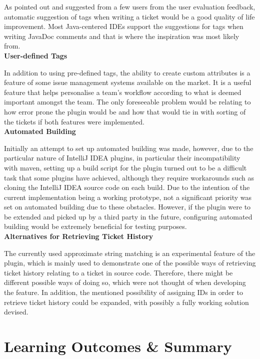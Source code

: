 \documentclass{4thYearProject}
\begin{document}
As pointed out and suggested from a few users from the user evaluation feedback, automatic suggestion of tags when writing a ticket would be a good quality of life improvement. Most Java-centered IDEs support the suggestions for tags when writing JavaDoc comments and that is where the inspiration was most likely from.\\ 
\newline
\textbf{User-defined Tags}

In addition to using pre-defined tags, the ability to create custom attributes is a feature of some issue management systems available on the market. It is a useful feature that helps personalise a team's workflow according to what is deemed important amongst the team. The only foreseeable problem would be relating to how error prone the plugin would be and how that would tie in with sorting of the tickets if both features were implemented. \\
\newline
\textbf{Automated Building}

Initially an attempt to set up automated building was made, however, due to the particular nature of IntelliJ IDEA plugins, in particular their incompatibility with  maven, setting up a build script for the plugin turned out to be a difficult task that some plugins have achieved, although they require workarounds such as cloning the IntelliJ IDEA source code on each build. Due to the intention of the current implementation being a working prototype, not a significant priority was set on automated building due to these obstacles. However, if the plugin were to be extended and picked up by a third party in the future, configuring automated building would be extremely beneficial for testing purposes. \\
\newline
\textbf{Alternatives for Retrieving Ticket History}

The currently used approximate string matching is an experimental feature of the plugin, which is mainly used to demonstrate one of the possible ways of retrieving ticket history relating to a ticket in source code. Therefore, there might be different possible ways of doing so, which were not thought of when developing the feature. In addition, the mentioned possibility of assigning IDs in order to retrieve ticket history  could be expanded, with possibly a fully working solution devised.  

\section{Learning Outcomes \& Summary}
\end{document}
